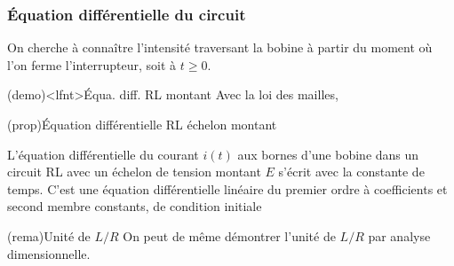 \documentclass[../../main/main.tex]{subfiles}
\begin{document}
\subsubsection{Équation différentielle du circuit}
On cherche à connaître l'intensité traversant la bobine à partir du moment où
l'on ferme l'interrupteur, soit à $t \geq 0$.
\begin{tcb}[label=demo:eqdiffrl](demo)<lfnt>{Équa. diff. RL montant}
	Avec la loi des mailles,
	\vspace{-15pt}
\end{tcb}
\begin{tcb}[label=prop:eqdifflc, sidebyside, righthand ratio=.4](prop){Équation
			différentielle RL échelon montant}

	L'équation différentielle du courant $i(t)$ aux bornes d'une bobine
	dans un circuit RL avec un échelon de tension montant $E$ s'écrit
	\psw{
		\[
			\boxed{\dv{i}{t} + \frac{1}{\tau}i = \frac{1}{\tau}\frac{E}{R}}
		\]
	}
	avec  la constante de temps.
	\tcblower
	C'est une équation différentielle linéaire du premier ordre à
	coefficients et second membre constants, de condition initiale
	\psw{
		\[
			\boxed{i(0^-) = i(0^+) = 0}
		\]
	}
\end{tcb}

\begin{tcb}(rema){Unité de $L/R$}
	On peut de même démontrer l'unité de $L/R$ par analyse dimensionnelle.
\end{tcb}
\end{document}
